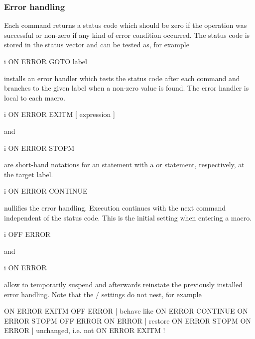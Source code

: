  
\condbreak{2cm}
\subsubsection{Error handling}

Each command returns a status code which should be zero if the
operation was successful or non-zero if any kind of error condition
occurred. 
The status code is stored in the  status vector and can be
tested as, for example

\begin{Gray}{i}
ON ERROR GOTO label
\end{Gray}
installs an error handler which tests the status code after each
command and branches to the given label when a non-zero value is
found.
The error handler is local to each macro.

\begin{Gray}{i}
ON ERROR EXITM  [ expression ]
\end{Gray}
and
\begin{Gray}{i}
ON ERROR STOPM
\end{Gray}
are short-hand notations for an  statement with a
 or  statement, respectively, at the target
label.

\begin{Gray}{i}
ON ERROR CONTINUE
\end{Gray}
nullifies the error handling.
Execution continues with the next command independent of the status
code.
This is the initial setting when entering a macro.

\begin{Gray}{i}
OFF ERROR
\end{Gray}
and
\begin{Gray}{i}
ON ERROR
\end{Gray}
allow to temporarily suspend and afterwards reinstate the previously
installed error handling.
Note that the / settings do not nest, for example
\begin{XMP}
ON  ERROR EXITM
OFF ERROR        | behave like ON ERROR CONTINUE
ON  ERROR STOPM
OFF ERROR
ON  ERROR        | restore ON ERROR STOPM
ON  ERROR        | unchanged, i.e. not ON ERROR EXITM !
\end{XMP}

